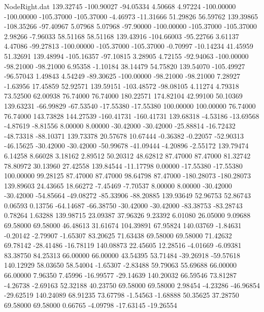 \begin{filecontents}{NodeRight.dat}
 139.32745 -100.90027  -94.05334     4.50668    4.97224 -100.00000 -100.00000 -105.37000 -105.37000   -4.46973  -11.31666   51.29826   56.59762
 139.39865 -108.35266  -97.40967     5.07968    5.07968  -97.90000 -100.00000 -105.37000 -105.37000    2.98266   -7.96033   58.51168   58.51168
 139.43916 -104.66003  -95.22766     3.61137    4.47086  -99.27813 -100.00000 -105.37000 -105.37000   -0.70997  -10.14234   41.45959   51.32691
 139.48994 -105.16357  -97.10815     3.28905    4.72155  -92.94063 -100.00000  -98.21000  -98.21000    6.95358   -1.10184   38.14479   54.75820
 139.54070 -105.49927  -96.57043     1.49843    4.54249  -89.30625 -100.00000  -98.21000  -98.21000    7.28927   -1.63956   17.45859   52.92571
 139.59151 -103.48572  -98.08105     4.11274    4.79318   73.52500   62.00938   76.74000   76.74000  180.22571  174.82104   42.99100   50.10369
 139.63231  -66.99829  -67.53540   -17.55380  -17.55380  100.00000  100.00000   76.74000   76.74000  143.73828  144.27539 -160.41731 -160.41731
 139.68318   -4.53186  -13.69568    -4.87619   -8.81556    8.00000    8.00000  -30.42000  -30.42000  -25.88814  -16.72432  -48.73318  -88.10371
 139.73378   20.57678   10.67444    -0.36382   -0.22057  -52.90313  -46.15625  -30.42000  -30.42000  -50.99678  -41.09444   -4.20896   -2.55172
 139.79474    6.14258    8.66028     3.18162    2.89512   50.20312   48.62812   87.47000   87.47000   81.32742   78.80972   30.13960   27.42558
 139.84544  -11.17798    0.00000   -17.55380  -17.55380  100.00000   99.28125   87.47000   87.47000   98.64798   87.47000 -180.28073 -180.28073
 139.89603   24.43665   18.66272    -7.45469   -7.70537    8.00000    8.00000  -30.42000  -30.42000  -54.85664  -49.08272  -85.33906  -88.20885
 139.93649   52.96753   52.86743     0.06593    0.13756  -64.14687  -66.38750  -30.42000  -30.42000  -83.38753  -83.28743    0.78264    1.63288
 139.98715   23.09387   37.96326     9.23392    6.01080   26.05000    9.09688   69.58000   69.58000   46.48613   31.61674  104.39891   67.95824
 140.03769   -1.84631   -0.20142    -2.79907   -1.65307   83.20625   71.63438   69.58000   69.58000   71.42632   69.78142  -28.41486  -16.78119
 140.08873   22.45605   12.28516    -4.01669   -6.09381   83.38750   84.25313   66.00000   66.00000   43.54395   53.71484  -39.26918  -59.57618
 140.12929   58.03650   58.54004    -1.65307   -2.83488   59.79063   55.69688   66.00000   66.00000    7.96350    7.45996  -16.99577  -29.14639
 140.20032   66.59546   73.81287    -4.26738   -2.69163   52.32188   40.23750   69.58000   69.58000    2.98454   -4.23286  -46.96854  -29.62519
 140.24089   68.91235   73.67798    -1.54563   -1.68888   50.35625   37.28750   69.58000   69.58000    0.66765   -4.09798  -17.63145  -19.26554

\end{filecontents}
